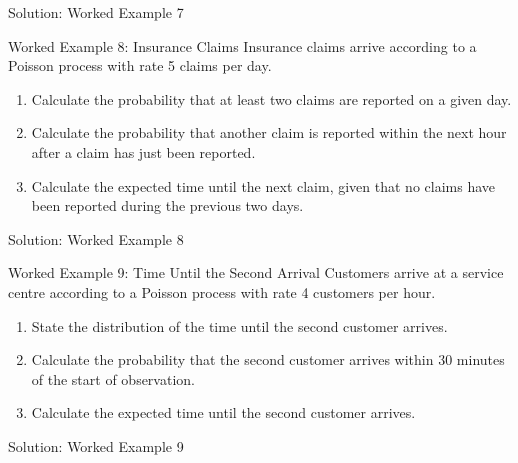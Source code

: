 \documentclass[
  ignorenonframetext,
  aspectratio=169,
]{beamer}
\providecommand{\tightlist}{%
  \setlength{\itemsep}{0pt}\setlength{\parskip}{0pt}}
\begin{document}
\begin{frame}{Solution: Worked Example 7}
\protect{}\label{solution-worked-example-7}
\end{frame}

\begin{frame}{Worked Example 8: Insurance Claims}
\protect{}\label{worked-example-8-insurance-claims}
Insurance claims arrive according to a Poisson process with rate 5
claims per day.

\begin{enumerate}
\tightlist
\item
  Calculate the probability that at least two claims are reported on a
  given day.
\item
  Calculate the probability that another claim is reported within the
  next hour after a claim has just been reported.
\item
  Calculate the expected time until the next claim, given that no claims
  have been reported during the previous two days.
\end{enumerate}
\end{frame}

\begin{frame}{Solution: Worked Example 8}
\protect{}\label{solution-worked-example-8}
\end{frame}

\begin{frame}{Worked Example 9: Time Until the Second Arrival}
\protect{}\label{worked-example-9-time-until-the-second-arrival}
Customers arrive at a service centre according to a Poisson process with
rate 4 customers per hour.

\begin{enumerate}
\tightlist
\item
  State the distribution of the time until the second customer arrives.
\item
  Calculate the probability that the second customer arrives within 30
  minutes of the start of observation.
\item
  Calculate the expected time until the second customer arrives.
\end{enumerate}
\end{frame}

\begin{frame}{Solution: Worked Example 9}
\protect{}\label{solution-worked-example-9}
\end{frame}
\end{document}
